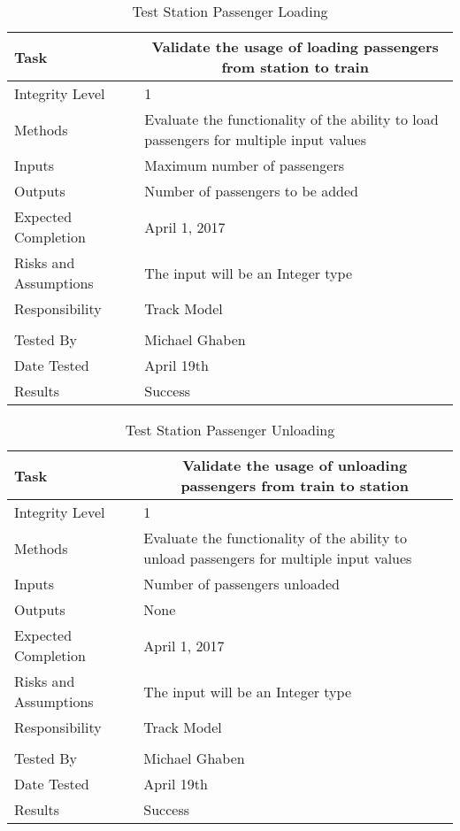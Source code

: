 \documentclass[]{article}
\begin{document}
\begin{table}[H]
	\centering
	\caption{Test Station Passenger Loading}
	\begin{tabular}{|l|l|}
		\hline
		Task & \multicolumn{1}{c|}{Validate the usage of loading passengers from station to train} \\ \hline
		Integrity Level & 1 \\ \hline
		Methods & Evaluate the functionality of the ability to load passengers for multiple input values \\ \hline
		Inputs &  Maximum number of passengers\\ \hline
		Outputs &  \parbox[t]{10cm}{Number of passengers to be added}\\ \hline
		Expected Completion & April 1, 2017\\ \hline
		Risks and Assumptions & The input will be an Integer type \\ \hline
		Responsibility & Track Model\\ \hline
		\\ \hline
		Tested By   &  Michael Ghaben\\	\hline
		Date Tested & \parbox[t]{10cm}{April 19th}\\ \hline
		Results & Success\\ \hline
	\end{tabular}
\end{table}

\begin{table}[H]
	\centering
	\caption{Test Station Passenger Unloading}
	\begin{tabular}{|l|l|}
		\hline
		Task & \multicolumn{1}{c|}{Validate the usage of unloading passengers from train to station} \\ \hline
		Integrity Level & 1 \\ \hline
		Methods & Evaluate the functionality of the ability to unload passengers for multiple input values \\ \hline
		Inputs &  Number of passengers unloaded\\ \hline
		Outputs &  \parbox[t]{10cm}{None}\\ \hline
		Expected Completion & April 1, 2017\\ \hline
		Risks and Assumptions & The input will be an Integer type \\ \hline
		Responsibility & Track Model\\ \hline
		\\ \hline
		Tested By   &  Michael Ghaben\\	\hline
		Date Tested & \parbox[t]{10cm}{April 19th}\\ \hline
		Results & Success\\ \hline

	\end{tabular}
\end{table}
\end{document}
